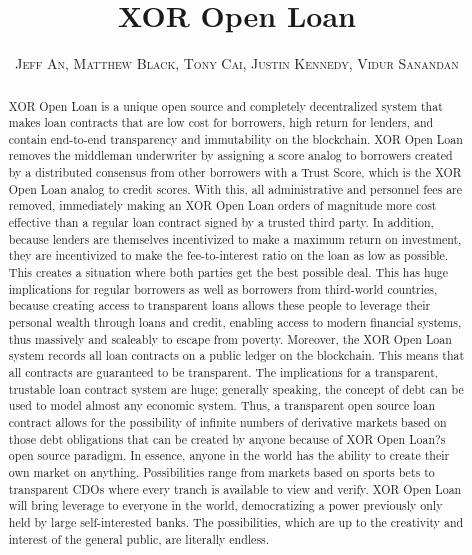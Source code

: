 \documentclass[twoside]{article}
\title{\vspace{-15mm}\fontsize{24pt}{10pt}\selectfont\textbf{XOR Open Loan}} %
\author{\large\textsc{Jeff An, Matthew Black, Tony Cai, Justin Kennedy, Vidur Sanandan}\\[2mm]} %
\date{}
\begin{document}
\maketitle %


\begin{abstract}
XOR Open Loan is a unique open source and completely decentralized system that makes loan contracts that are low cost for borrowers, high return for lenders, and contain end-to-end transparency and immutability on the blockchain. XOR Open Loan removes the middleman underwriter by assigning a score analog to borrowers created by a distributed consensus from other borrowers with a Trust Score, which is the XOR Open Loan analog to credit scores. With this, all administrative and personnel fees are removed, immediately making an XOR Open Loan orders of magnitude more cost effective than a regular loan contract signed by a trusted third party. In addition, because lenders are themselves incentivized to make a maximum return on investment, they are incentivized to make the fee-to-interest ratio on the loan as low as possible. This creates a situation where both parties get the best possible deal. This has huge implications for regular borrowers as well as borrowers from third-world countries, because creating access to transparent loans allows these people to leverage their personal wealth through loans and credit, enabling access to modern financial systems, thus massively and scaleably to escape from poverty.  Moreover, the XOR Open Loan system records all loan contracts on a public ledger on the blockchain. This means that all contracts are guaranteed to be transparent. The implications for a transparent, trustable loan contract system are huge; generally speaking, the concept of debt can be used to model almost any economic system. Thus, a transparent open source loan contract allows for the possibility of infinite numbers of derivative markets based on those debt obligations that can be created by anyone because of XOR Open Loan?s open source paradigm. In essence, anyone in the world has the ability to create their own market on anything. Possibilities range from markets based on sports bets to transparent CDOs where every tranch is available to view and verify. XOR Open Loan will bring leverage to everyone in the world, democratizing a power previously only held by large self-interested banks. The possibilities, which are up to the creativity and interest of the general public, are literally endless.
\end{abstract}
\end{document}

